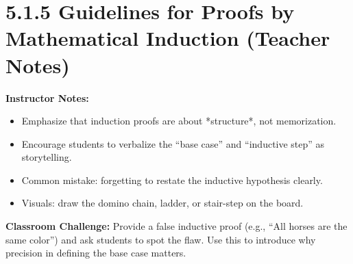 \section*{5.1.5 Guidelines for Proofs by Mathematical Induction (Teacher Notes)}

\textbf{Instructor Notes:}
\begin{itemize}
  \item Emphasize that induction proofs are about *structure*, not memorization.
  \item Encourage students to verbalize the “base case” and “inductive step” as storytelling.
  \item Common mistake: forgetting to restate the inductive hypothesis clearly.
  \item Visuals: draw the domino chain, ladder, or stair-step on the board.
\end{itemize}

\textbf{Classroom Challenge:}  
Provide a false inductive proof (e.g., “All horses are the same color”) and ask
students to spot the flaw. Use this to introduce why precision in defining the
base case matters.

